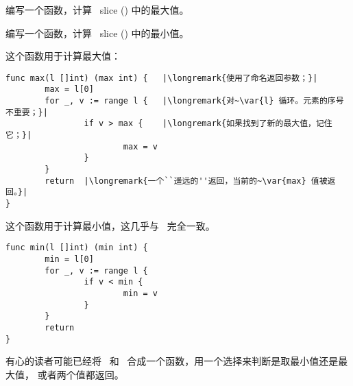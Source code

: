\begin{Exercise}[title={最小值和最大值},difficulty=0]
\label{ex:minmax}
\Question\label{ex:minmax q1} 编写一个函数，计算~ slice () 中的最大值。

\Question\label{ex:minmax q2} 编写一个函数，计算~ slice () 中的最小值。

\end{Exercise}

\begin{Answer}
\Question 这个函数用于计算最大值：
\begin{lstlisting}
func max(l []int) (max int) {   |\longremark{使用了命名返回参数；}|
        max = l[0]      
        for _, v := range l {   |\longremark{对~\var{l} 循环。元素的序号不重要；}|
                if v > max {    |\longremark{如果找到了新的最大值，记住它；}|
                        max = v 
                }   
        }   
        return  |\longremark{一个``遥远的''返回，当前的~\var{max} 值被返回。}|
}
\end{lstlisting}
\showremarks

\Question 这个函数用于计算最小值，这几乎与~ 完全一致。
\begin{lstlisting}
func min(l []int) (min int) {
        min = l[0]
        for _, v := range l { 
                if v < min {
                        min = v 
                }   
        }   
        return
}
\end{lstlisting}
有心的读者可能已经将~ 和~ 合成一个函数，用一个选择来判断是取最小值还是最大值，
或者两个值都返回。
\end{Answer}
